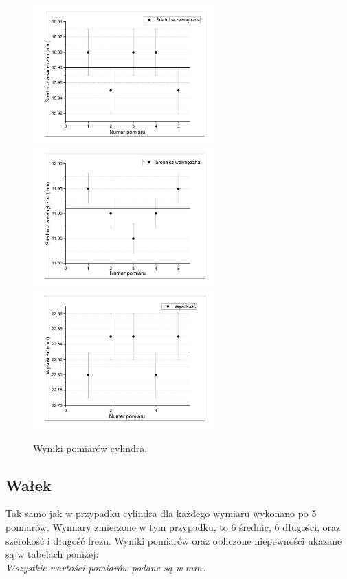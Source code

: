 \begin{figure}[ht]
    \centering
    \includegraphics[width=70mm]{imgs/cylinder_2.png}
    \includegraphics[width=70mm]{imgs/cylinder_1.png}
    \includegraphics[width=70mm]{imgs/cylinder_3.png}
    \caption{Wyniki pomiarów cylindra.}
    \label{fig:cylinder_pomiary}
\end{figure}

{\subsection{Wałek}}

Tak samo jak w przypadku cylindra dla każdego wymiaru wykonano po 5 pomiarów.
Wymiary zmierzone w tym przypadku, to 6 średnic, 6 długości, oraz szerokość i długość frezu.
Wyniki pomiarów oraz obliczone niepewności ukazane są w tabelach poniżej: \\

{\indent \small \textit{Wszystkie wartości pomiarów podane są w $mm$.}}

